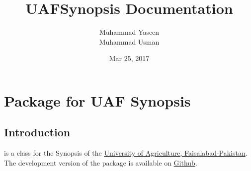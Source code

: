 \documentclass[letterpaper,10pt,english]{sphinxmanual}
\title{UAFSynopsis Documentation}
\date{Mar 25, 2017}
\author{Muhammad Yaseen\\Muhammad Usman}
\begin{document}
\maketitle
\sphinxtableofcontents
{}\label{\detokenize{index::doc}}



\chapter{ Package for UAF Synopsis}
\label{\detokenize{index:uafsynopsis-s-documentation}}\label{\detokenize{index:latex-package-for-uaf-synopsis}}

\section{Introduction}
\label{\detokenize{index:introduction}}
 is a   class for the Synopsis of the \href{https://uaf.edu.pk}{University of Agriculture, Faisalabad-Pakistan}. The development version of the package is available on \href{https://github.com/MYaseen208/UAFSynopsis}{Github}.
\end{document}
